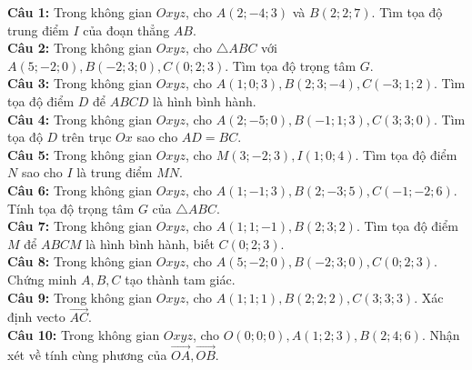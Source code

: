 \documentclass[12pt]{article}
\begin{document}
	\begin{btdo}
		\noindent \textbf{Câu 1:} Trong không gian $Oxyz$, cho $A(2; -4; 3)$ và $B(2; 2; 7)$. Tìm tọa độ trung điểm $I$ của đoạn thẳng $AB$. \\
		\noindent \textbf{Câu 2:} Trong không gian $Oxyz$, cho $\triangle ABC$ với $A(5; -2; 0), B(-2; 3; 0), C(0; 2; 3)$. Tìm tọa độ trọng tâm $G$. \\
		\noindent \textbf{Câu 3:} Trong không gian $Oxyz$, cho $A(1; 0; 3), B(2; 3; -4), C(-3; 1; 2)$. Tìm tọa độ điểm $D$ để $ABCD$ là hình bình hành. \\
		\noindent \textbf{Câu 4:} Trong không gian $Oxyz$, cho $A(2; -5; 0), B(-1; 1; 3), C(3; 3; 0)$. Tìm tọa độ $D$ trên trục $Ox$ sao cho $AD = BC$. \\
		\noindent \textbf{Câu 5:} Trong không gian $Oxyz$, cho $M(3; -2; 3), I(1; 0; 4)$. Tìm tọa độ điểm $N$ sao cho $I$ là trung điểm $MN$. \\
		\noindent \textbf{Câu 6:} Trong không gian $Oxyz$, cho $A(1; -1; 3), B(2; -3; 5), C(-1; -2; 6)$. Tính tọa độ trọng tâm $G$ của $\triangle ABC$. \\
		\noindent \textbf{Câu 7:} Trong không gian $Oxyz$, cho $A(1; 1; -1), B(2; 3; 2)$. Tìm tọa độ điểm $M$ để $ABCM$ là hình bình hành, biết $C(0; 2; 3)$. \\
		\noindent \textbf{Câu 8:} Trong không gian $Oxyz$, cho $A(5; -2; 0), B(-2; 3; 0), C(0; 2; 3)$. Chứng minh $A, B, C$ tạo thành tam giác. \\
		\noindent \textbf{Câu 9:} Trong không gian $Oxyz$, cho $A(1; 1; 1), B(2; 2; 2), C(3; 3; 3)$. Xác định vecto $\vec{AC}$. \\
		\noindent \textbf{Câu 10:} Trong không gian $Oxyz$, cho $O(0;0;0), A(1; 2; 3), B(2; 4; 6)$. Nhận xét về tính cùng phương của $\vec{OA}, \vec{OB}$.
	\end{btdo}
\end{document}
